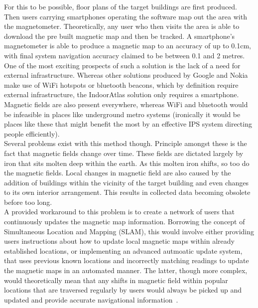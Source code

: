 \documentclass[main.tex]{subfiles}
\begin{document}
For this to be possible, floor plans of the target buildings are first produced. Then users carrying smartphones operating the software map out the area with the magnetometer. Theoretically, any user who then visits the area is able to download the pre built magnetic map and then be tracked. A smartphone's magnetometer is able to produce a magnetic map to an accuracy of up to 0.1cm, with final system navigation accuracy claimed to be between 0.1 and 2 metres. \\
 
One of the most exciting prospects of such a solution is the lack of a need for external infrastructure. Whereas other solutions produced by Google and Nokia make use of WiFi hotspots or bluetooth beacons, which by definition require external infrastructure, the IndoorAtlas solution only requires a smartphone. Magnetic fields are also present everywhere, whereas WiFi and bluetooth would be infeasible in places like underground metro systems (ironically it would be places like these that might benefit the most by an effective IPS system directing people efficiently).\\
 
Several problems exist with this method though. Principle amongst these is the fact that magnetic fields change over time. These fields are dictated largely by iron that sits molten deep within the earth. As this molten iron shifts, so too do the magnetic fields. Local changes in magnetic field are also caused by the addition of buildings within the vicinity of the target building and even changes to its own interior arrangement. This results in collected data becoming obsolete before too long.\\
 
 A provided workaround to this problem is to create a network of users that continuously updates the magnetic map information. Borrowing the concept of Simultaneous Location and Mapping (SLAM), this would involve either providing users instructions about how to update local magnetic maps within already established locations, or implementing an advanced autmoatic update system, that uses previous known locations and incorrectly matching readings to update the magnetic maps in an automated manner. The latter, though more complex, would theoretically mean that any shifts in magnetic field within popular locations that are traversed regularly by users would always be picked up and updated and provide accurate navigational information~\cite{IAReport}.\\
 
\end{document}
